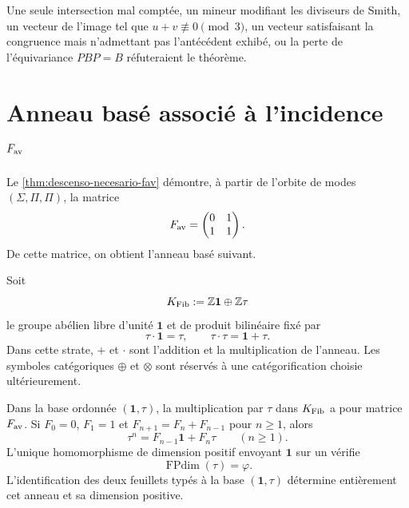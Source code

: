 \begin{criterion} \label{crit:incidencia-residuo-soporte} Une seule intersection mal comptée, un mineur modifiant les diviseurs de Smith, un vecteur de l’image tel que \(u+v\not\equiv0\pmod3\), un vecteur satisfaisant la congruence mais n’admettant pas l’antécédent exhibé, ou la perte de l’équivariance \(PBP=B\) réfuteraient le théorème.
\end{criterion}

\section[Anneau basé de Fibonacci]{Anneau basé associé à l’incidence \texorpdfstring{\(F_{\rm av}\)}{F\_av}}
\label{sec:anillo-basado-fibonacci}

Le \cref{thm:descenso-necesario-fav} démontre, à partir de l’orbite de modes \((\Sigma,\Pi,\Pi)\), la matrice
\[
 F_{\rm av}=
 \begin{pmatrix}0&1\\1&1\end{pmatrix}.
\]
De cette matrice, on obtient l’anneau basé suivant.

\begin{definition}
\label{def:anillo-basado-fibonacci}
Soit
\[
 K_{\rm Fib}:=\mathbb Z\mathbf 1\oplus\mathbb Z\tau
\]
le groupe abélien libre d’unité \(\mathbf 1\) et de produit bilinéaire fixé par
\[
 \tau\cdot\mathbf 1=\tau,\qquad
 \tau\cdot\tau=\mathbf 1+\tau.
\]
Dans cette strate, \(+\) et \(\cdot\) sont l’addition et la multiplication de l’anneau. Les symboles catégoriques \(\oplus\) et \(\otimes\) sont réservés à une catégorification choisie ultérieurement.
\end{definition}

\begin{theorem}
\label{thm:anillo-fibonacci-fav} Dans la base ordonnée \((\mathbf 1,\tau)\), la multiplication par \(\tau\) dans \(K_{\rm Fib}\) a pour matrice \(F_{\rm av}\). Si \(F_0=0\), \(F_1=1\) et \(F_{n+1}=F_n+F_{n-1}\) pour \(n\geq1\), alors
\[
 \tau^n=F_{n-1}\mathbf 1+F_n\tau
 \qquad(n\geq1).
\]
L’unique homomorphisme de dimension positif envoyant \(\mathbf 1\) sur un vérifie
\[
 \operatorname{FPdim}(\tau)=\varphi.
\]
L’identification des deux feuillets typés à la base \((\mathbf 1,\tau)\) détermine entièrement cet anneau et sa dimension positive.
\end{theorem}

